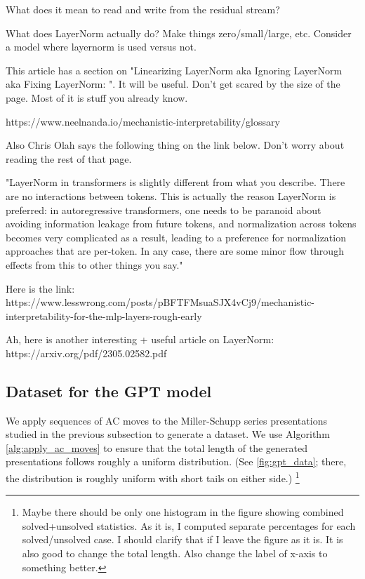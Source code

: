 What does it mean to read and write from the residual stream? 

What does LayerNorm actually do? Make things zero/small/large, etc. Consider a model where layernorm is used versus not. 

This article has a section on "Linearizing LayerNorm aka Ignoring LayerNorm aka Fixing LayerNorm: ". It will be useful. Don't get scared by the size of the page. Most of it is stuff you already know.

https://www.neelnanda.io/mechanistic-interpretability/glossary

Also Chris Olah says the following thing on the link below. Don't worry about reading the rest of that page.

"LayerNorm in transformers is slightly different from what you describe. There are no interactions between tokens. This is actually the reason LayerNorm is preferred: in autoregressive transformers, one needs to be paranoid about avoiding information leakage from future tokens, and normalization across tokens becomes very complicated as a result, leading to a preference for normalization approaches that are per-token. In any case, there are some minor flow through effects from this to other things you say."

Here is the link: https://www.lesswrong.com/posts/pBFTFMsuaSJX4vCj9/mechanistic-interpretability-for-the-mlp-layers-rough-early

Ah, here is another interesting + useful article on LayerNorm: https://arxiv.org/pdf/2305.02582.pdf


\subsection{Dataset for the GPT model}

We apply sequences of AC moves to the Miller-Schupp series presentations studied in the previous subsection to generate a dataset.
We use Algorithm \autoref{alg:apply_ac_moves} to ensure that the total length of the generated presentations follows roughly a uniform distribution.
(See \autoref{fig:gpt_data}; there, the distribution is roughly uniform with short tails on either side.)
\footnote{Maybe there should be only one histogram in the figure showing combined solved+unsolved statistics.
As it is, I computed separate percentages for each solved/unsolved case.
I should clarify that if I leave the figure as it is.
It is also good to change the total length.
Also change the label of x-axis to something better.}

